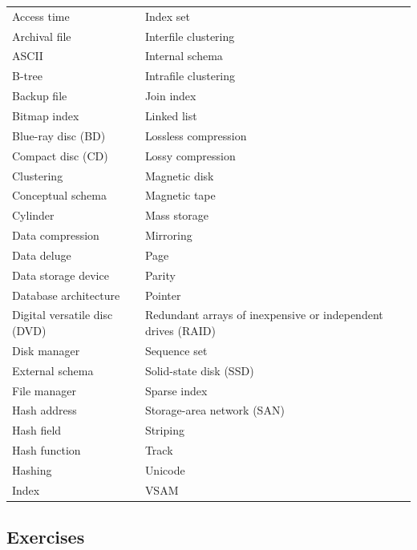 \documentclass[
]{article}
\begin{document}
\begin{longtable}[]{@{}
  >{\raggedright\arraybackslash}p{}
  >{\raggedright\arraybackslash}p{}@{}}
\toprule
& \\
\midrule
\endhead
Access time & Index set \\
Archival file & Interfile clustering \\
ASCII & Internal schema \\
B-tree & Intrafile clustering \\
Backup file & Join index \\
Bitmap index & Linked list \\
Blue-ray disc (BD) & Lossless compression \\
Compact disc (CD) & Lossy compression \\
Clustering & Magnetic disk \\
Conceptual schema & Magnetic tape \\
Cylinder & Mass storage \\
Data compression & Mirroring \\
Data deluge & Page \\
Data storage device & Parity \\
Database architecture & Pointer \\
Digital versatile disc (DVD) & Redundant arrays of inexpensive or independent drives (RAID) \\
Disk manager & Sequence set \\
External schema & Solid-state disk (SSD) \\
File manager & Sparse index \\
Hash address & Storage-area network (SAN) \\
Hash field & Striping \\
Hash function & Track \\
Hashing & Unicode \\
Index & VSAM \\
\bottomrule
\end{longtable}

\hypertarget{exercises-11}{%
\subsection*{Exercises}\label{exercises-11}}
\end{document}
